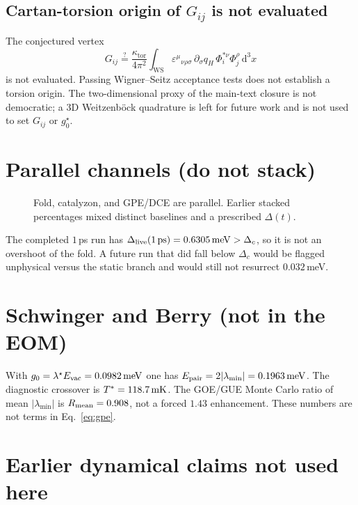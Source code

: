 \documentclass[11pt,letterpaper]{article}
\begin{document}
\subsection{Cartan-torsion origin of \texorpdfstring{$G_{ij}$}{Gij} is not evaluated}

The conjectured vertex
\begin{equation}
G_{ij}\stackrel{?}{=}\frac{\kappa_{\mathrm{tor}}}{4\pi^2}\int_{\mathrm{WS}}\varepsilon^{\mu}{}_{\nu\rho\sigma}\,
\partial_\sigma q_H\,\Phi_i^{*\nu}\Phi_j^\rho\,\mathrm{d}^3x
\end{equation}
is not evaluated. Passing Wigner--Seitz acceptance tests does not establish a torsion origin. The two-dimensional proxy of the main-text closure is not democratic; a 3D Weitzenb\"ock quadrature is left for future work and is not used to set $G_{ij}$ or $g_0^\star$.

\section{Parallel channels (do not stack)}
\label{sec:parallel}

\begin{figure}[H]
\centering

\caption{Fold, catalyzon, and GPE/DCE are parallel. Earlier stacked percentages mixed distinct baselines and a prescribed $\Delta(t)$.}
\label{fig:ch-s}
\end{figure}

The completed $1$\,ps run has $\Delta_{\mathrm{live}}(1\,\mathrm{ps})=0.6305\,\mathrm{meV}>\Delta_c$, so it is not an overshoot of the fold. A future run that did fall below $\Delta_c$ would be flagged unphysical versus the static branch and would still not resurrect $0.032$\,meV.

\section{Schwinger and Berry (not in the EOM)}
\label{sec:schberry}

With $g_0=\lambda^\star E_{\mathrm{vac}}=0.0982\,\mathrm{meV}$ one has $E_{\mathrm{pair}}=2|\lambda_{\min}|=0.1963\,\mathrm{meV}$. The diagnostic crossover is $T^*=118.7\,\mathrm{mK}$. The GOE/GUE Monte Carlo ratio of mean $|\lambda_{\min}|$ is $R_{\mathrm{mean}}=0.908$, not a forced $1.43$ enhancement. These numbers are not terms in Eq.~\eqref{eq:gpe}.

\section{Earlier dynamical claims not used here}
\label{sec:withdrawn}
\end{document}
